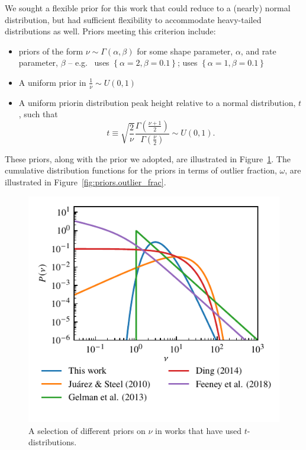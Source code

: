 \documentclass[fleqn,usenatbib]{rasti}
\begin{document}
We sought a flexible prior for this work that could reduce to a (nearly) normal
distribution, but had sufficient flexibility to accommodate heavy-tailed
distributions as well. Priors meeting this criterion include:
\begin{itemize}
    \item priors of the form $\nu \sim \Gamma(\alpha, \beta)$ for
          some shape parameter, $\alpha$, and rate parameter, $\beta$ -- e.g.\
          \citet{Juarez:2010} uses $\left\{\alpha = 2, \beta = 0.1\right\}$;
          \citet{Ding:2014} uses $\left\{\alpha = 1, \beta = 0.1\right\}$
    \item A uniform prior in $\frac1\nu \sim U(0, 1)$ \citep{Gelman:2013}
    \item A uniform prior\footnotemark in distribution peak height relative to a
    normal distribution, $t$, such that
    \begin{equation}
        t \equiv
           \sqrt{\frac2\nu}\frac{
                \Gamma\left(\frac{\nu + 1}{2}\right)
            }{
                \Gamma\left(\frac{\nu}{2}\right)
            } \sim U(0, 1).
    \end{equation}
\end{itemize}
These priors, along with the prior we adopted, are illustrated in
Figure~\ref{fig:priors.pdf}. The cumulative distribution functions for the
priors in terms of outlier fraction, $\omega$, are illustrated in
Figure~\ref{fig:priors.outlier_frac}.

\begin{figure}
	\includegraphics[width=\columnwidth]{graphics/pdf_nu}
    \caption{A selection of different priors on $\nu$ in works that have used
    $t$-distributions.}
    \label{fig:priors.pdf}
\end{figure}
\end{document}
